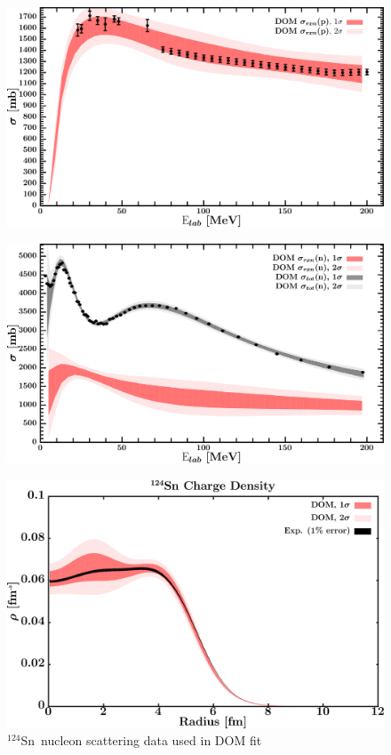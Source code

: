 \documentclass[twocolumn,secnumarabic,amssymb, nobibnotes, aps, prl,
superscriptaddress, nobalancelastpage]{revtex4}
\newcommand{\snFour}{\ensuremath{^{124}}S\lowercase{n}}
\begin{document}
\begin{figure}[!htb]
\begin{minipage}{0.4\linewidth}
        \includegraphics[width=\linewidth]{figures/sn124_protonInelastic.png}
        \label{DOM_sn124_proton_inelastic}
    \end{minipage}\hspace{6pt}
    \begin{minipage}{0.4\linewidth}
        \centering
        \includegraphics[width=\linewidth]{figures/sn124_neutronInelastic.png}
        \label{DOM_sn124_neutron_inelastic}
    \end{minipage}
    \caption{\snFour\ nucleon scattering data used in DOM fit}
    \label{DOM_sn124_scattering}
    \centering
    \begin{minipage}{0.4\linewidth}
        \centering
        \includegraphics[width=\linewidth]{figures/sn124_chargeDensity.png}

\end{minipage}
\end{figure}
\end{document}
